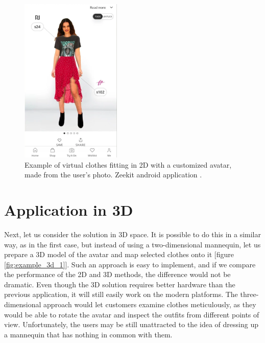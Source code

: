 \documentclass[a4paper]{report}
\begin{document}
\begin{figure}[H]
\centering
 \includegraphics[height = 300, keepaspectratio]{images/VFR/VFR_example_2D_2(2).png}
 \caption{Example of virtual clothes fitting in 2D with a customized avatar, made from the user's photo. Zeekit android application \cite{zeekit}.}
  \label{fig:example_2d_2}
\end{figure}


\section{Application in 3D}
\qquad Next, let us consider the solution in 3D space. It is possible to do this in a similar way, as in the first case, but instead of using a two-dimensional mannequin, let us prepare a 3D model of the avatar and map selected clothes onto it [figure \ref{fig:example_3d_1}]. Such an approach is easy to implement, and if we compare the performance of the 2D and 3D methods, the difference would not be dramatic. Even though the 3D solution requires better hardware than the previous application, it will still easily work on the modern platforms. The three-dimensional approach would let customers examine clothes meticulously, as they would be able to rotate the avatar and inspect the outfits from different points of view. Unfortunately, the users may be still unattracted to the idea of dressing up a mannequin that has nothing in common with them.
\end{document}
